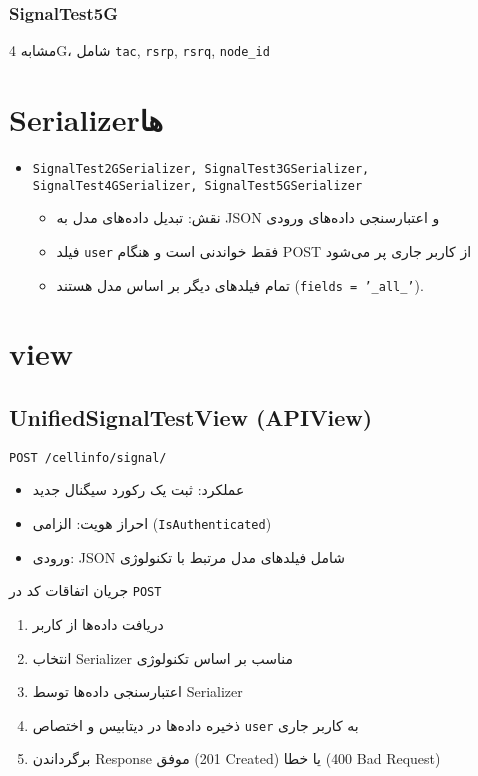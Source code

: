 \documentclass{report}
\begin{document}
\subsubsection{SignalTest5G}
مشابه 4G، شامل \texttt{tac}, \texttt{rsrp}, \texttt{rsrq}, \texttt{node\_id}

\section{Serializerها}
\begin{itemize}
    \item \texttt{SignalTest2GSerializer, SignalTest3GSerializer, SignalTest4GSerializer, SignalTest5GSerializer}
    \begin{itemize}
        \item نقش: تبدیل داده‌های مدل به JSON و اعتبارسنجی داده‌های ورودی
        \item فیلد \texttt{user} فقط خواندنی است و هنگام POST از کاربر جاری پر می‌شود
        \item تمام فیلدهای دیگر بر اساس مدل هستند (\texttt{fields = '\_all\_'}).
    \end{itemize}
\end{itemize}

\section{view}
\subsection{UnifiedSignalTestView (APIView)}
\texttt{POST /cellinfo/signal/}
\begin{itemize}
    \item عملکرد: ثبت یک رکورد سیگنال جدید
    \item احراز هویت: الزامی (\texttt{IsAuthenticated})
    \item ورودی: JSON شامل فیلدهای مدل مرتبط با تکنولوژی
\end{itemize}

جریان اتفاقات کد در \texttt{POST}
\begin{enumerate}
    \item دریافت داده‌ها از کاربر
    \item انتخاب Serializer مناسب بر اساس تکنولوژی
    \item اعتبارسنجی داده‌ها توسط Serializer
    \item ذخیره داده‌ها در دیتابیس و اختصاص \texttt{user} به کاربر جاری
    \item برگرداندن Response موفق (201 Created) یا خطا (400 Bad Request)
\end{enumerate}
\end{document}
